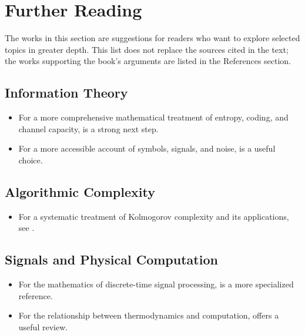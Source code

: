 \chapter*{Further Reading}

The works in this section are suggestions for readers who want to explore selected topics in greater depth. This list does not replace the sources cited in the text; the works supporting the book's arguments are listed in the References section.

\section*{Information Theory}
\begin{itemize}
  \item For a more comprehensive mathematical treatment of entropy, coding, and channel capacity,  is a strong next step.
  \item For a more accessible account of symbols, signals, and noise,  is a useful choice.
\end{itemize}

\section*{Algorithmic Complexity}
\begin{itemize}
  \item For a systematic treatment of Kolmogorov complexity and its applications, see .
\end{itemize}

\section*{Signals and Physical Computation}
\begin{itemize}
  \item For the mathematics of discrete-time signal processing,  is a more specialized reference.
  \item For the relationship between thermodynamics and computation,  offers a useful review.
\end{itemize}
